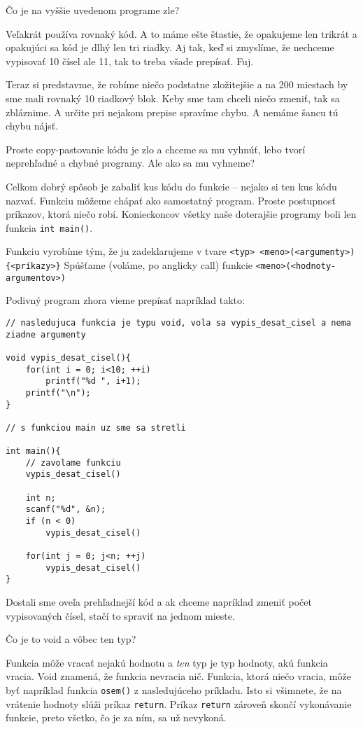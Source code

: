 Čo je na vyššie uvedenom programe zle?

Veľakrát používa rovnaký kód. A to máme ešte štastie, že opakujeme len trikrát
a opakujúci sa kód je dlhý len tri riadky. Aj tak, keď si zmyslíme, že nechceme
vypisovať 10 čísel ale 11, tak to treba všade prepísať. Fuj.

Teraz si predstavme, že robíme niečo podstatne zložitejšie a na 200 miestach by
sme mali rovnaký 10 riadkový blok. Keby sme tam chceli niečo zmeniť, tak sa
zbláznime.  A určite pri nejakom prepise spravíme chybu. A nemáme šancu tú
chybu nájsť.

Proste copy-pastovanie kódu je zlo a chceme sa mu vyhnúť, lebo tvorí
neprehľadné a chybné programy. Ale ako sa mu vyhneme?

\medskip

Celkom dobrý spôsob je zabaliť kus kódu do funkcie -- nejako si ten kus kódu
nazvať.  Funkciu môžeme chápať ako samostatný program. Proste postupnosť
príkazov, ktorá niečo robí.  Konieckoncov všetky naše doterajšie programy boli
len funkcia \verb!int main()!.

Funkciu vyrobíme tým, že ju zadeklarujeme v tvare \verb!<typ> <meno>(<argumenty>){<príkazy>}!
Spúšťame (voláme, po anglicky call) funkcie \verb!<meno>(<hodnoty-argumentov>)!

Podivný program zhora vieme prepísať napríklad takto:

\begin{lstlisting}
// nasledujuca funkcia je typu void, vola sa vypis_desat_cisel a nema ziadne argumenty

void vypis_desat_cisel(){
    for(int i = 0; i<10; ++i)
        printf("%d ", i+1);
    printf("\n"); 
}

// s funkciou main uz sme sa stretli

int main(){
    // zavolame funkciu
    vypis_desat_cisel()
    
    int n;
    scanf("%d", &n);
    if (n < 0)
        vypis_desat_cisel()

    for(int j = 0; j<n; ++j) 
        vypis_desat_cisel()
}
\end{lstlisting}

Dostali sme oveľa prehľadnejší kód a ak chceme napríklad zmeniť počet
vypisovaných čísel, stačí to spraviť na jednom mieste.

\medskip 

Čo je to void a vôbec ten typ?

Funkcia môže vracať nejakú hodnotu a \textit{ten} typ je typ hodnoty, akú
funkcia vracia.  Void znamená, že funkcia nevracia nič. Funkcia, ktorá niečo
vracia, môže byť napríklad funkcia \verb!osem()! z nasledujúceho príkladu. Isto
si všimnete, že na vrátenie hodnoty slúži príkaz \verb!return!. Príkaz
\verb!return! zároveň skončí vykonávanie funkcie, preto všetko, čo je za ním,
sa už nevykoná. 

